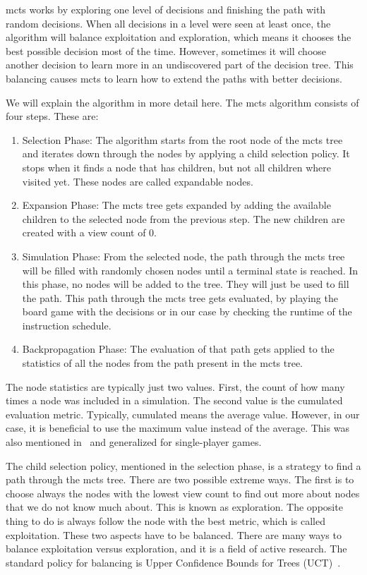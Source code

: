 \ac{mcts} works by exploring one level of decisions  and finishing the path with random decisions.
When all decisions in a level were seen at least once, the algorithm will balance exploitation and exploration, which means it chooses the best possible decision most of the time.
However, sometimes it will choose another decision to learn more in an undiscovered part of the decision tree.
This balancing causes \ac{mcts} to learn how to extend the paths with better decisions.

We will explain the algorithm in more detail here.
The \ac{mcts} algorithm consists of four steps.
These are:
\begin{enumerate}
    \item Selection Phase:
        The algorithm starts from the root node of the \ac{mcts} tree and iterates down through the nodes by applying a child selection policy.
        It stops when it finds a node that has children, but not all children where visited yet.
        These nodes are called expandable nodes.
    \item Expansion Phase:
        The \ac{mcts} tree gets expanded by adding the available children to the selected node from the previous step.
        The new children are created with a view count of 0.
    \item Simulation Phase:
        From the selected node, the path through the \ac{mcts} tree will be filled with randomly chosen nodes until a terminal state is reached.
        In this phase, no nodes will be added to the tree.
        They will just be used to fill the path.
        This path through the \ac{mcts} tree gets evaluated, \eg by playing the board game with the decisions or in our case by checking the runtime of the instruction schedule.
    \item Backpropagation Phase:
        The evaluation of that path gets applied to the statistics of all the nodes from the path present in the \ac{mcts} tree.
\end{enumerate}
The node statistics are typically just two values.
First, the count of how many times a node was included in a simulation.
The second value is the cumulated evaluation metric.
Typically, cumulated means the average value.
However, in our case, it is beneficial to use the maximum value instead of the average.
This was also mentioned in~\cite{bjornsson2009cadiaplayer} and generalized for single-player games.

The child selection policy, mentioned in the selection phase, is a strategy to find a path through the \ac{mcts} tree.
There are two possible extreme ways.
The first is to choose always the nodes with the lowest view count to find out more about nodes that we do not know much about.
This is known as exploration.
The opposite thing to do is always follow the node with the best metric, which is called exploitation.
These two aspects have to be balanced.
There are many ways to balance exploitation versus exploration, and it is a field of active research.
The standard policy for balancing is Upper Confidence Bounds for Trees (UCT)~\cite{kocsis2006bandit,kocsis2006improved}.

